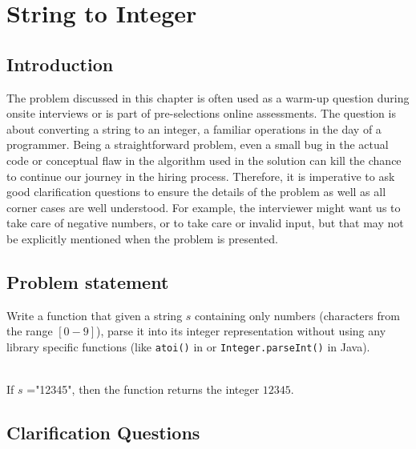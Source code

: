 %

\chapter{String to Integer}
\label{ch:string_to_int}
\section*{Introduction}
The problem discussed in this chapter is often used as a warm-up question during onsite interviews or is  part of pre-selections online assessments.
The question is about converting a string to an integer, a familiar operations in the day of a programmer. 
Being a straightforward problem,  even a small bug in the actual code or conceptual flaw in the algorithm used in the solution can kill the chance to continue our journey in the hiring process.  
Therefore, it is imperative to ask good clarification questions to ensure the details of the problem as well as all corner cases are well understood.
For example,  the interviewer might want us to take care of negative numbers, or to take care or invalid input, but that may not be explicitly mentioned when the problem is presented.

\section{Problem statement}
\begin{exercise}
Write a function that given a string $s$ containing only numbers (characters from the range $[0-9]$), parse it into its integer representation without using any library specific functions (like \texttt{atoi()} in \CC or  \texttt{Integer.parseInt()} in Java).


\begin{example}
	\label{ex:stringint:example1}
	\hfill \\
	If $s$ ="12345", then the function returns the integer $12345$.	
\end{example}

\end{exercise}

\section{Clarification Questions}

